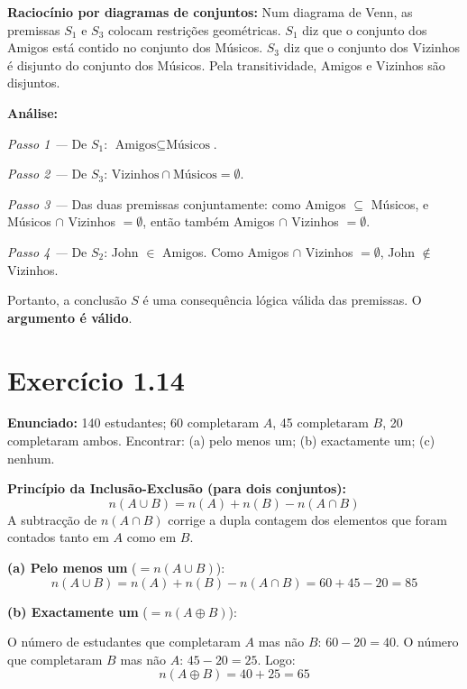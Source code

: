 \documentclass[12pt,a4paper]{article}
\begin{document}
\begin{teoribox}
\textbf{Raciocínio por diagramas de conjuntos:} Num diagrama de Venn, as premissas $S_1$ e $S_3$ colocam restrições geométricas. $S_1$ diz que o conjunto dos Amigos está contido no conjunto dos Músicos. $S_3$ diz que o conjunto dos Vizinhos é disjunto do conjunto dos Músicos. Pela transitividade, Amigos e Vizinhos são disjuntos.
\end{teoribox}

\textbf{Análise:}

\textit{Passo 1 ---} De $S_1$: $\text{Amigos} \subseteq \text{Músicos}$.

\textit{Passo 2 ---} De $S_3$: $\text{Vizinhos} \cap \text{Músicos} = \emptyset$.

\textit{Passo 3 ---} Das duas premissas conjuntamente: como Amigos $\subseteq$ Músicos, e Músicos $\cap$ Vizinhos $= \emptyset$, então também Amigos $\cap$ Vizinhos $= \emptyset$.

\textit{Passo 4 ---} De $S_2$: John $\in$ Amigos. Como Amigos $\cap$ Vizinhos $= \emptyset$, John $\notin$ Vizinhos.

Portanto, a conclusão $S$ é uma consequência lógica válida das premissas. O \textbf{argumento é válido}.

\section*{Exercício 1.14}

\textbf{Enunciado:} 140 estudantes; 60 completaram $A$, 45 completaram $B$, 20 completaram ambos. Encontrar: (a) pelo menos um; (b) exactamente um; (c) nenhum.

\begin{teoribox}
\textbf{Princípio da Inclusão-Exclusão (para dois conjuntos):}
\[
n(A \cup B) = n(A) + n(B) - n(A \cap B)
\]
A subtracção de $n(A \cap B)$ corrige a dupla contagem dos elementos que foram contados tanto em $A$ como em $B$.
\end{teoribox}

\textbf{(a) Pelo menos um} ($= n(A \cup B)$):
\[
n(A \cup B) = n(A) + n(B) - n(A \cap B) = 60 + 45 - 20 = 85
\]

\textbf{(b) Exactamente um} ($= n(A \oplus B)$):

O número de estudantes que completaram $A$ mas não $B$: $60 - 20 = 40$.
O número que completaram $B$ mas não $A$: $45 - 20 = 25$. Logo:
\[
n(A \oplus B) = 40 + 25 = 65
\]
\end{document}
